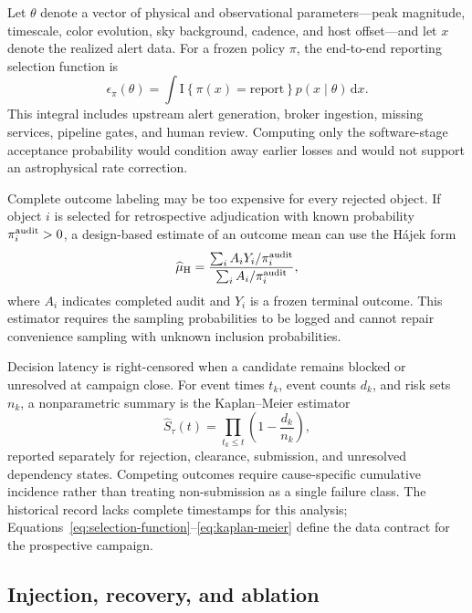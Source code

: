 \documentclass[11pt]{article}
\begin{document}
Let $\theta$ denote a vector of physical and observational parameters---peak magnitude, timescale, color evolution, sky background, cadence, and host offset---and let $x$ denote the realized alert data. For a frozen policy $\pi$, the end-to-end reporting selection function is
\begin{equation}
  \epsilon_{\pi}(\theta)=
  \int \mathrm{I}\!\left\{\pi(x)=\text{report}\right\}
  p(x\mid\theta)\,\mathrm{d}x.
\label{eq:selection-function}
\end{equation}
This integral includes upstream alert generation, broker ingestion, missing services, pipeline gates, and human review. Computing only the software-stage acceptance probability would condition away earlier losses and would not support an astrophysical rate correction.

Complete outcome labeling may be too expensive for every rejected object. If object $i$ is selected for retrospective adjudication with known probability $\pi_i^{\rm audit}>0$, a design-based estimate of an outcome mean can use the H\'ajek form
\begin{equation}
  \widehat{\mu}_{\rm H}=
  \frac{\sum_i A_iY_i/\pi_i^{\rm audit}}
       {\sum_i A_i/\pi_i^{\rm audit}},
\label{eq:hajek}
\end{equation}
where $A_i$ indicates completed audit and $Y_i$ is a frozen terminal outcome. This estimator requires the sampling probabilities to be logged and cannot repair convenience sampling with unknown inclusion probabilities.

Decision latency is right-censored when a candidate remains blocked or unresolved at campaign close. For event times $t_k$, event counts $d_k$, and risk sets $n_k$, a nonparametric summary is the Kaplan--Meier estimator
\begin{equation}
  \widehat{S}_{\tau}(t)=\prod_{t_k\leq t}\left(1-\frac{d_k}{n_k}\right),
\label{eq:kaplan-meier}
\end{equation}
reported separately for rejection, clearance, submission, and unresolved dependency states. Competing outcomes require cause-specific cumulative incidence rather than treating non-submission as a single failure class. The historical record lacks complete timestamps for this analysis; Equations~\ref{eq:selection-function}--\ref{eq:kaplan-meier} define the data contract for the prospective campaign.

\subsection{Injection, recovery, and ablation}
\end{document}

